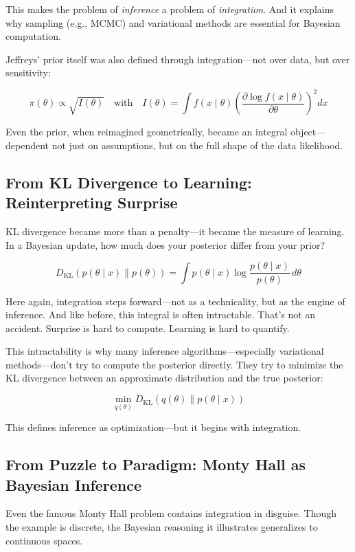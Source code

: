 This makes the problem of \emph{inference} a problem of \emph{integration}. And it explains why sampling (e.g., MCMC) and variational methods are essential for Bayesian computation.

Jeffreys’ prior itself was also defined through integration—not over data, but over sensitivity:

\[
\pi(\theta) \propto \sqrt{I(\theta)} \quad \text{with} \quad I(\theta) = \int f(x \mid \theta) \left( \frac{\partial \log f(x \mid \theta)}{\partial \theta} \right)^2 dx
\]

Even the prior, when reimagined geometrically, became an integral object—dependent not just on assumptions, but on the full shape of the data likelihood.

\subsection{From KL Divergence to Learning: Reinterpreting Surprise}

KL divergence became more than a penalty—it became the measure of learning. In a Bayesian update, how much does your posterior differ from your prior?

\[
D_{\mathrm{KL}}(p(\theta \mid x) \parallel p(\theta)) = \int p(\theta \mid x) \log \frac{p(\theta \mid x)}{p(\theta)} \, d\theta
\]

Here again, integration steps forward—not as a technicality, but as the engine of inference. And like before, this integral is often intractable. That’s not an accident. Surprise is hard to compute. Learning is hard to quantify.

This intractability is why many inference algorithms—especially variational methods—don’t try to compute the posterior directly. They try to minimize the KL divergence between an approximate distribution and the true posterior:

\[
\min_{q(\theta)} D_{\mathrm{KL}}(q(\theta) \parallel p(\theta \mid x))
\]

This defines inference as optimization—but it begins with integration.

\subsection{From Puzzle to Paradigm: Monty Hall as Bayesian Inference}

Even the famous Monty Hall problem contains integration in disguise. Though the example is discrete, the Bayesian reasoning it illustrates generalizes to continuous spaces.

